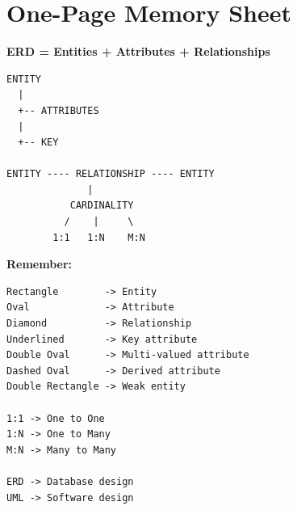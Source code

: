 \documentclass[12pt,a4paper]{article}
\begin{document}
\section{One-Page Memory Sheet}

\begin{center}
\textbf{\Large ERD = Entities + Attributes + Relationships}
\end{center}

\begin{verbatim}
ENTITY
  |
  +-- ATTRIBUTES
  |
  +-- KEY

ENTITY ---- RELATIONSHIP ---- ENTITY
              |
           CARDINALITY
          /    |     \
        1:1   1:N    M:N
\end{verbatim}

\textbf{Remember:}

\begin{verbatim}
Rectangle        -> Entity
Oval             -> Attribute
Diamond          -> Relationship
Underlined       -> Key attribute
Double Oval      -> Multi-valued attribute
Dashed Oval      -> Derived attribute
Double Rectangle -> Weak entity

1:1 -> One to One
1:N -> One to Many
M:N -> Many to Many

ERD -> Database design
UML -> Software design
\end{verbatim}
\end{document}
